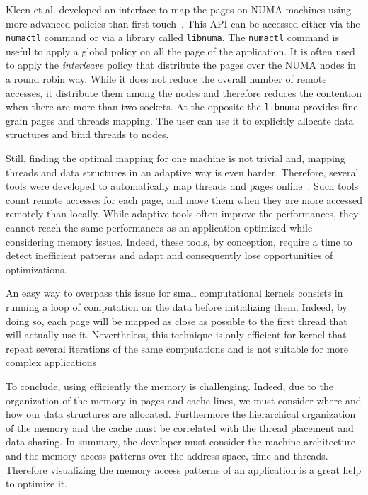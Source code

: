 Kleen et al. developed an interface to map the pages on \gls{NUMA} machines using more advanced policies than first touch~\cite{Kleen05NUMA}.
This \gls{API} can be accessed either via the \texttt{numactl} command or via a library called \texttt{libnuma}.
The \texttt{numactl} command is useful to apply a global policy on all the page of the application.
It is often used to apply the \emph{interleave} policy that distribute the pages over the \gls{NUMA} nodes in a round robin way.
While it does not reduce the overall number of remote accesses, it distribute them among the nodes and therefore reduces the contention when there are more than two sockets.
At the opposite the \texttt{libnuma} provides fine grain pages and threads mapping.
The user can use it to explicitly allocate data structures and bind threads to nodes.

Still, finding the optimal mapping for one machine is not trivial and, mapping threads and data structures in an adaptive way is even harder.
Therefore, several tools were developed to automatically map threads and pages online~\cite{Diener14kMAF,Corbet12Toward}.
Such tools count remote accesses for each page, and move them when they are more accessed remotely than locally.
While adaptive tools often improve the performances, they cannot reach the same performances as an application optimized while considering memory issues.
Indeed, these tools, by conception, require a time to detect inefficient patterns and adapt and consequently lose opportunities of optimizations.

An easy way to overpass this issue for small computational kernels consists in running a loop of computation on the data before initializing them.
Indeed, by doing so, each page will be mapped as close as possible to the first thread that will actually use it.
Nevertheless, this technique is only efficient for kernel that repeat several iterations of the same computations and is not suitable for more complex applications


To conclude, using efficiently the memory is challenging.
Indeed, due to the organization of the memory in pages and cache lines, we must consider where and how our data structures are allocated.
Furthermore the hierarchical organization of the memory and the cache must be correlated with the thread placement and data sharing.
In summary, the developer must consider the machine architecture and the memory access patterns over the address space, time and threads.
Therefore visualizing the memory access patterns of an application is a great help to optimize it.

